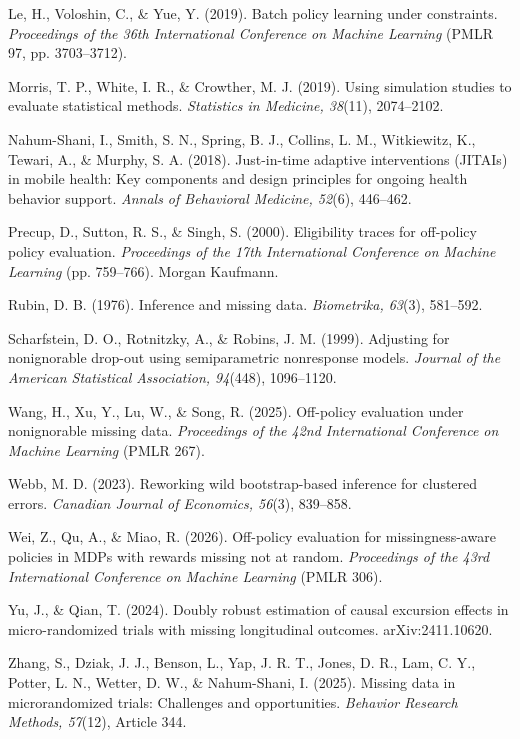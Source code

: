 \documentclass[12pt]{article}
\begin{document}
\begin{list}{}{\setlength{\leftmargin}{0.5in}\setlength{\itemindent}{-0.5in}\setlength{\itemsep}{3pt}}
\item Le, H., Voloshin, C., \& Yue, Y. (2019). Batch policy learning under constraints. \textit{Proceedings of the 36th International Conference on Machine Learning} (PMLR 97, pp. 3703--3712).

\item Morris, T. P., White, I. R., \& Crowther, M. J. (2019). Using simulation studies to evaluate statistical methods. \textit{Statistics in Medicine, 38}(11), 2074--2102.

\item Nahum-Shani, I., Smith, S. N., Spring, B. J., Collins, L. M., Witkiewitz, K., Tewari, A., \& Murphy, S. A. (2018). Just-in-time adaptive interventions (JITAIs) in mobile health: Key components and design principles for ongoing health behavior support. \textit{Annals of Behavioral Medicine, 52}(6), 446--462.

\item Precup, D., Sutton, R. S., \& Singh, S. (2000). Eligibility traces for off-policy policy evaluation. \textit{Proceedings of the 17th International Conference on Machine Learning} (pp. 759--766). Morgan Kaufmann.

\item Rubin, D. B. (1976). Inference and missing data. \textit{Biometrika, 63}(3), 581--592.

\item Scharfstein, D. O., Rotnitzky, A., \& Robins, J. M. (1999). Adjusting for nonignorable drop-out using semiparametric nonresponse models. \textit{Journal of the American Statistical Association, 94}(448), 1096--1120.

\item Wang, H., Xu, Y., Lu, W., \& Song, R. (2025). Off-policy evaluation under nonignorable missing data. \textit{Proceedings of the 42nd International Conference on Machine Learning} (PMLR 267).

\item Webb, M. D. (2023). Reworking wild bootstrap-based inference for clustered errors. \textit{Canadian Journal of Economics, 56}(3), 839--858.

\item Wei, Z., Qu, A., \& Miao, R. (2026). Off-policy evaluation for missingness-aware policies in MDPs with rewards missing not at random. \textit{Proceedings of the 43rd International Conference on Machine Learning} (PMLR 306).

\item Yu, J., \& Qian, T. (2024). Doubly robust estimation of causal excursion effects in micro-randomized trials with missing longitudinal outcomes. arXiv:2411.10620.

\item Zhang, S., Dziak, J. J., Benson, L., Yap, J. R. T., Jones, D. R., Lam, C. Y., Potter, L. N., Wetter, D. W., \& Nahum-Shani, I. (2025). Missing data in microrandomized trials: Challenges and opportunities. \textit{Behavior Research Methods, 57}(12), Article 344.

\end{list}
\end{document}
